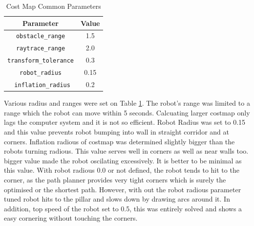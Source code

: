 \documentclass[10pt,journal,compsoc]{IEEEtran}
\begin{document}
\begin{table}[ht]
      \caption{Cost Map Common Parameters}
      \label{table:costmap_common_parameters}
      \begin{center}
      \begin{tabular}{|c|c|}
      \hline
      Parameter & Value \\
      \hline\hline
      \verb!obstacle_range! & 1.5 \\
      \hline
      \verb!raytrace_range! & 2.0 \\
      \hline
      \verb!transform_tolerance! & 0.3 \\
      \hline
      \verb!robot_radius!& 0.15 \\
      \hline
      \verb! inflation_radius!& 0.2 \\
      
      \hline
      \end{tabular}
      \end{center}
\end{table}
Various radius and ranges were set on Table \ref{table:costmap_common_parameters}. The robot's range was limited to a range which the robot can move within 5 seconds. Calcuating larger costmap only lags the computer system and it is not so efficient.
Robot Radius was set to 0.15 and this value prevents robot bumping into wall in straight corridor and at corners. Inflation radious of costmap was determined slightly bigger than the robots turning radious. This value serves well in corners as well as near walls too. bigger value made the robot oscilating excessively. It is better to be minimal as this value.
With robot radious 0.0 or not defined, the robot tends to hit to the corner, as the path planner provides very tight corners which is surely the optimised or the shortest path. However, with out the robot radious parameter tuned robot hits to the pillar and slows down by drawing arcs around it. In addition, top speed of the robot set to 0.5, this was entirely solved and shows a easy cornering without touching the corners.
\end{document}
